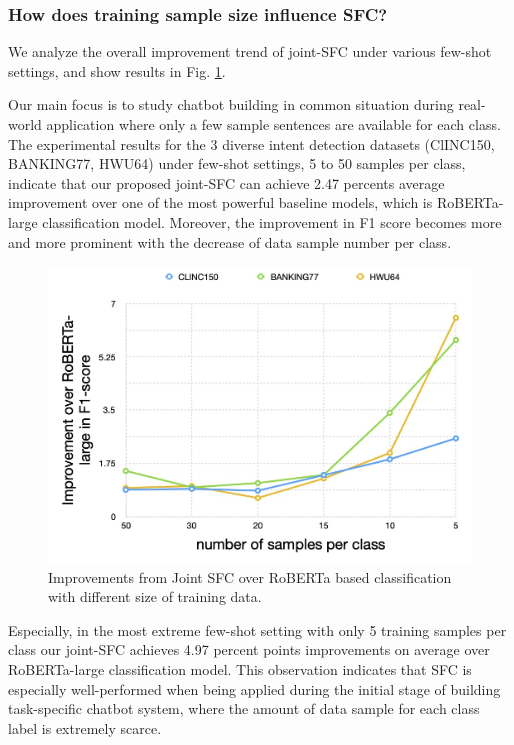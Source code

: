 \subsubsection*{How does training sample size influence SFC?} 
We analyze the overall improvement trend of joint-SFC under various few-shot
settings, and show results in Fig. \ref{fig:trend}.

Our main focus is to study chatbot building in common situation during real-world
application where only a few sample sentences are available for each class.
The experimental results for the 3 diverse intent detection datasets
(ClINC150, BANKING77, HWU64) under few-shot settings, 5 to 50 samples per
class, indicate that our proposed joint-SFC can achieve 2.47 percents average
improvement over one of the most powerful baseline models, which is
RoBERTa-large classification model. Moreover, the improvement in F1 score
becomes more and more prominent with the decrease of data sample number per
class.

\begin{figure}[t]
  \begin{centering}
    \includegraphics[scale=0.2]{picture/improvement_trend.jpg} 
    \par
  \end{centering}
  \caption{
    Improvements from Joint SFC over RoBERTa based classification with
    different size of training data.
  }
  \label{fig:trend}
\end{figure}

Especially, in the most extreme few-shot setting with only 5 training samples
per class our joint-SFC achieves 4.97 percent points improvements on average
over RoBERTa-large classification model. This observation indicates that SFC
is especially well-performed when being applied during the initial stage of
building task-specific chatbot system, where the amount of data sample for
each class label is extremely scarce.

